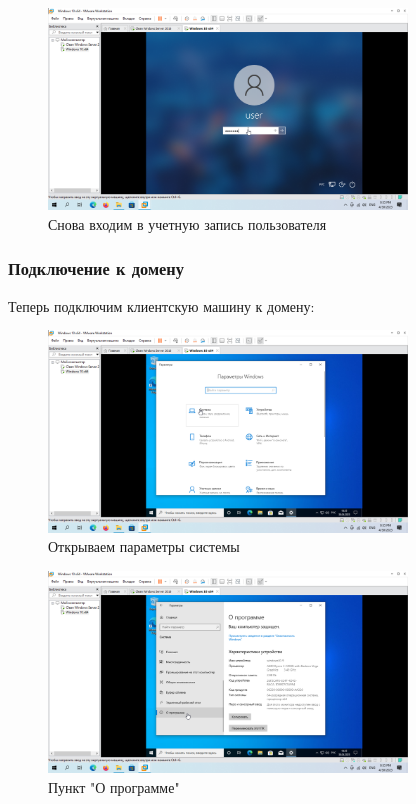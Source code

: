 \documentclass[a4paper]{article}
\begin{document}
  \begin{figure}[H]
    \centering
    \includegraphics[width=0.85\textwidth]{Screenshot_98}
    \caption{Снова входим в учетную запись пользователя}
    \label{img:98}
  \end{figure}

  \subsubsection{Подключение к домену}

  Теперь подключим клиентскую машину к домену:

  \begin{figure}[H]
    \centering
    \includegraphics[width=0.85\textwidth]{Screenshot_99}
    \caption{Открываем параметры системы}
    \label{img:99}
  \end{figure}

  \begin{figure}[H]
    \centering
    \includegraphics[width=0.85\textwidth]{Screenshot_100}
    \caption{Пункт "О программе"}
    \label{img:100}
  \end{figure}
\end{document}
